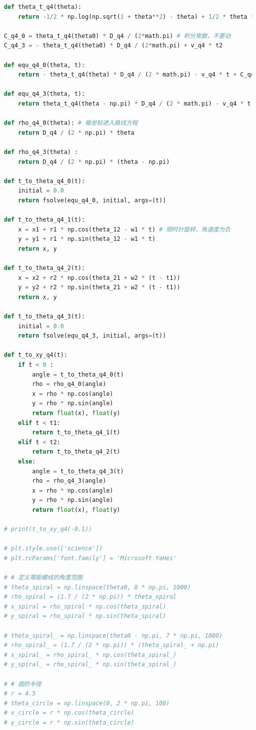 \documentclass[a4paper]{article}
\begin{document}
\begin{lstlisting}[language=python,columns=fullflexible,frame=shadowbox]
def theta_t_q4(theta):
	return -1/2 * np.log(np.sqrt(1 + theta**2) - theta) + 1/2 * theta * np.sqrt(theta ** 2 + 1)

C_q4_0 = theta_t_q4(theta0) * D_q4 / (2*math.pi) # 积分常数，不要动
C_q4_3 = - theta_t_q4(theta0) * D_q4 / (2*math.pi) + v_q4 * t2

def equ_q4_0(theta, t):
	return - theta_t_q4(theta) * D_q4 / (2 * math.pi) - v_q4 * t + C_q4_0

def equ_q4_3(theta, t):
	return theta_t_q4(theta - np.pi) * D_q4 / (2 * math.pi) - v_q4 * t + C_q4_3

def rho_q4_0(theta): # 极坐标进入路线方程
	return D_q4 / (2 * np.pi) * theta

def rho_q4_3(theta) :
	return D_q4 / (2 * np.pi) * (theta - np.pi)

def t_to_theta_q4_0(t):
	initial = 0.0
	return fsolve(equ_q4_0, initial, args=(t))

def t_to_theta_q4_1(t):
	x = x1 + r1 * np.cos(theta_12 - w1 * t) # 顺时针旋转，角速度为负
	y = y1 + r1 * np.sin(theta_12 - w1 * t)
	return x, y

def t_to_theta_q4_2(t):
	x = x2 + r2 * np.cos(theta_21 + w2 * (t - t1))
	y = y2 + r2 * np.sin(theta_21 + w2 * (t - t1))
	return x, y

def t_to_theta_q4_3(t):
	initial = 0.0
	return fsolve(equ_q4_3, initial, args=(t))

def t_to_xy_q4(t):
	if t < 0 :
		angle = t_to_theta_q4_0(t)
		rho = rho_q4_0(angle)
		x = rho * np.cos(angle)
		y = rho * np.sin(angle)
		return float(x), float(y)
	elif t < t1:
		return t_to_theta_q4_1(t)
	elif t < t2:
		return t_to_theta_q4_2(t)
	else:
		angle = t_to_theta_q4_3(t)
		rho = rho_q4_3(angle)
		x = rho * np.cos(angle)
		y = rho * np.sin(angle)
		return float(x), float(y)

# print(t_to_xy_q4(-0.1))

# plt.style.use(['science'])
# plt.rcParams['font.family'] = 'Microsoft YaHei'

# # 定义等距螺线的角度范围
# theta_spiral = np.linspace(theta0, 8 * np.pi, 1000)
# rho_spiral = (1.7 / (2 * np.pi)) * theta_spiral
# x_spiral = rho_spiral * np.cos(theta_spiral)
# y_spiral = rho_spiral * np.sin(theta_spiral)

# theta_spiral_ = np.linspace(theta0 - np.pi, 7 * np.pi, 1000)
# rho_spiral_ = (1.7 / (2 * np.pi)) * (theta_spiral_ + np.pi)
# x_spiral_ = rho_spiral_ * np.cos(theta_spiral_)
# y_spiral_ = rho_spiral_ * np.sin(theta_spiral_)

# # 圆的半径
# r = 4.5
# theta_circle = np.linspace(0, 2 * np.pi, 100)
# x_circle = r * np.cos(theta_circle)
# y_circle = r * np.sin(theta_circle)


\end{lstlisting}
\end{document}
